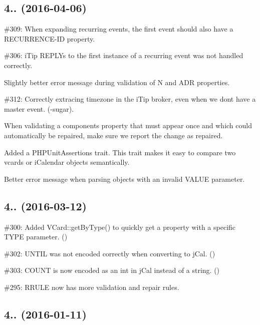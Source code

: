 \subsection*{4.. (2016-\/04-\/06) }


\begin{DoxyItemize}
\item \#309\+: When expanding recurring events, the first event should also have a {\ttfamily R\+E\+C\+U\+R\+R\+E\+N\+C\+E-\/\+ID} property.
\item \#306\+: i\+Tip R\+E\+P\+L\+Ys to the first instance of a recurring event was not handled correctly.
\item Slightly better error message during validation of {\ttfamily N} and {\ttfamily A\+DR} properties.
\item \#312\+: Correctly extracing timezone in the i\+Tip broker, even when we don\textquotesingle{}t have a master event. (-\/sugar).
\item When validating a component\textquotesingle{}s property that must appear once and which could automatically be repaired, make sure we report the change as \textquotesingle{}repaired\textquotesingle{}.
\item Added a P\+H\+P\+Unit\+Assertions trait. This trait makes it easy to compare two vcards or i\+Calendar objects semantically.
\item Better error message when parsing objects with an invalid {\ttfamily V\+A\+L\+UE} parameter.
\end{DoxyItemize}

\subsection*{4.. (2016-\/03-\/12) }


\begin{DoxyItemize}
\item \#300\+: Added {\ttfamily V\+Card\+::get\+By\+Type()} to quickly get a property with a specific {\ttfamily T\+Y\+PE} parameter. ()
\item \#302\+: {\ttfamily U\+N\+T\+IL} was not encoded correctly when converting to j\+Cal. ()
\item \#303\+: {\ttfamily C\+O\+U\+NT} is now encoded as an int in j\+Cal instead of a string. ()
\item \#295\+: {\ttfamily R\+R\+U\+LE} now has more validation and repair rules.
\end{DoxyItemize}

\subsection*{4.. (2016-\/01-\/11) }


